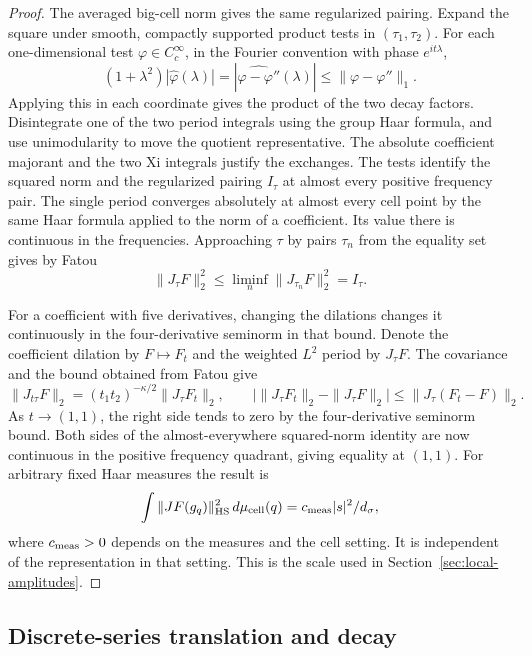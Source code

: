 \begin{proof}

The averaged big-cell norm gives the same regularized pairing.
Expand the square under smooth, compactly supported product tests
in \((\tau_1,\tau_2)\). For each one-dimensional test \(\varphi\in C_c^\infty\),
in the Fourier convention with phase \(e^{it\lambda}\),
\[
 (1+\lambda^2)|\widehat\varphi(\lambda)|
 =|\widehat{\varphi-\varphi''}(\lambda)|
 \le\|\varphi-\varphi''\|_1 .
\]
Applying this in each coordinate gives the product of the two decay factors. Disintegrate one
of the two period integrals using the group Haar formula, and use
unimodularity to move the quotient representative. The absolute
coefficient majorant and the two Xi integrals justify the exchanges.
The tests identify the squared norm and the regularized pairing
\(I_\tau\) at almost every positive frequency pair. The single period
converges absolutely at almost every cell point by the same Haar
formula applied to the norm of a coefficient. Its value there is
continuous in the frequencies. Approaching \(\tau\) by pairs
\(\tau_n\) from the equality set gives by Fatou
\[
   \|J_\tau F\|_2^2\le\liminf_n\|J_{\tau_n}F\|_2^2=I_\tau .
\]

For a coefficient with five
derivatives, changing the dilations changes it continuously in the
four-derivative seminorm in that bound. Denote the coefficient dilation by \(F\mapsto F_t\)
and the weighted \(L^2\) period by \(J_\tau F\).
The covariance and the bound obtained from Fatou give
\[
 \|J_{t\tau}F\|_2=(t_1t_2)^{-\kappa/2}\|J_\tau F_t\|_2,
 \qquad
 \big|\|J_\tau F_t\|_2-\|J_\tau F\|_2\big|
        \le \|J_\tau(F_t-F)\|_2 .
\]
As \(t\to(1,1)\), the right side tends to zero by the
four-derivative seminorm bound. Both sides of the
almost-everywhere squared-norm identity are now continuous in
the positive frequency quadrant, giving equality at \((1,1)\). For arbitrary fixed
Haar measures the result is
\[
  \int \|JF(g_q)\|_{\rm HS}^2\,d\mu_{\rm cell}(q)
       = c_{\rm meas}|s|^2/d_\sigma,
\]
where \(c_{\rm meas}>0\) depends on the measures and the cell
setting. It is independent of the representation in that setting.
This is the scale used in Section~\ref{sec:local-amplitudes}.

\end{proof}

\subsection{Discrete-series translation and decay}

